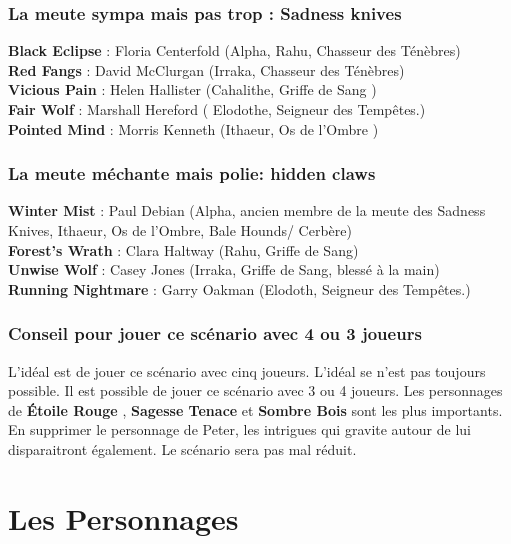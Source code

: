 \documentclass[oneside,12pt]{book}
\newcommand{\Lynn}{\textbf{Étoile Rouge} }
\newcommand{\Jessica}{\textbf{Sagesse Tenace} }
\newcommand{\Leonard}{\textbf{Sombre Bois} }
\newcommand{\BlackEclipse}{\textbf{Black Eclipse} }
\begin{document}
\begin{flushleft}
\subsection{La meute sympa mais pas trop : Sadness knives}
\label{sadnessknives}
\textbf{\BlackEclipse} : Floria Centerfold (Alpha, Rahu, Chasseur des Ténèbres)\\
\textbf{Red Fangs} : David McClurgan  (Irraka, Chasseur des Ténèbres)\\
\textbf{Vicious Pain} : Helen Hallister (Cahalithe, Griffe de Sang )\\
\textbf{Fair Wolf} :   Marshall Hereford ( Elodothe, Seigneur des Tempêtes.)\\
\textbf{Pointed Mind} : Morris Kenneth (Ithaeur, Os de l'Ombre )\\

\subsection{La meute méchante mais polie: hidden claws}
\label{hiddenclaws}
\textbf{Winter Mist} : Paul Debian (Alpha, ancien membre de la meute des Sadness Knives, Ithaeur, Os de l'Ombre, Bale Hounds/ Cerbère)\\
\textbf{Forest’s Wrath} : Clara Haltway (Rahu, Griffe de Sang) \\
\textbf{Unwise Wolf} : Casey Jones (Irraka, Griffe de Sang, blessé à la main)\\
\textbf{Running Nightmare} : Garry Oakman (Elodoth, Seigneur des Tempêtes.) \\

    \subsection{Conseil pour jouer ce scénario avec 4 ou 3 joueurs}
    L'idéal est de jouer ce scénario avec cinq joueurs. L'idéal se n'est pas toujours possible. Il est possible de
    jouer ce scénario avec 3 ou 4 joueurs. Les personnages de \Lynn, \Jessica et \Leonard sont les plus importants.\\
    En supprimer le personnage de Peter, les intrigues qui gravite autour de lui disparaitront également. Le scénario sera 
    pas mal réduit. 

\chapter{Les Personnages}
\clearpage

\end{flushleft}
\end{document}
